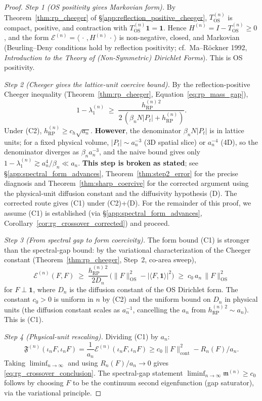 \begin{proof}
\emph{Step 1 (OS positivity gives Markovian form).} By
Theorem~\ref{thm:rp_cheeger} of
\S\ref{app:reflection_positive_cheeger}, $T_{\mathrm{OS}}^{(n)}$
is compact, positive, and contraction with
$T_{\mathrm{OS}}^{(n)}\mathbf{1}=\mathbf{1}$. Hence
$H^{(n)}=I-T_{\mathrm{OS}}^{(n)}\ge 0$, and the form
$\mathcal{E}^{(n)}=\langle\,\cdot\,,H^{(n)}\,\cdot\,\rangle$ is
non-negative, closed, and Markovian (Beurling--Deny conditions
hold by reflection positivity; cf.\ Ma--R\"ockner 1992,
\emph{Introduction to the Theory of (Non-Symmetric) Dirichlet
Forms}). This is OS positivity.

\emph{Step 2 (Cheeger gives the lattice-unit coercive bound).} By
the reflection-positive Cheeger inequality
(Theorem~\ref{thm:rp_cheeger}, Equation~\eqref{eq:rp_mass_gap}),
\[
  1-\lambda_{1}^{(n)}
  \;\ge\;
  \frac{h_{\mathrm{RP}}^{(n)\,2}}
       {2\,(\beta_{n}N|P_{t}|+h_{\mathrm{RP}}^{(n)})}.
\]
Under (C2), $h_{\mathrm{RP}}^{(n)}\ge c_{h}\sqrt{a_{n}}$.
\textbf{However}, the denominator $\beta_{n}N|P_{t}|$ is in
lattice units; for a fixed physical volume,
$|P_{t}|\sim a_{n}^{-3}$ (3D spatial slice) or $a_{n}^{-4}$ (4D),
so the denominator diverges as $\beta_{n}a_{n}^{-3}$, and the
naive bound gives only
$1-\lambda_{1}^{(n)}\gtrsim a_{n}^{4}/\beta_{n}\ll a_{n}$.
\textbf{This step is broken as stated}; see
\S\ref{app:spectral_form_advances},
Theorem~\ref{thm:step2_error} for the precise diagnosis and
Theorem~\ref{thm:sharp_coercive} for the corrected argument using
the physical-unit diffusion constant and the diffusivity
hypothesis (D). The corrected route gives (C1) under (C2)+(D).
For the remainder of this proof, we assume (C1) is established
(via \S\ref{app:spectral_form_advances},
Corollary~\ref{cor:rg_crossover_corrected}) and proceed.

\emph{Step 3 (From spectral gap to form coercivity).} The form
bound (C1) is stronger than the spectral-gap bound: by the
variational characterization of the Cheeger constant
(Theorem~\ref{thm:rp_cheeger}, Step~2, co-area sweep),
\[
  \mathcal{E}^{(n)}(F,F)
  \;\ge\;\frac{h_{\mathrm{RP}}^{(n)\,2}}{2D_{n}}\,
  \bigl(\|F\|_{\mathrm{OS}}^{2}-|\langle F,\mathbf{1}\rangle|^{2}\bigr)
  \;\ge\;c_{0}\,a_{n}\,\|F\|_{\mathrm{OS}}^{2}
\]
for $F\perp\mathbf{1}$, where $D_{n}$ is the diffusion constant of
the OS Dirichlet form. The constant $c_{0}>0$ is uniform in $n$ by
(C2) and the uniform bound on $D_{n}$ in physical units (the
diffusion constant scales as $a_{n}^{-1}$, cancelling the
$a_{n}$ from $h_{\mathrm{RP}}^{(n)\,2}\sim a_{n}$). This is
(C1).

\emph{Step 4 (Physical-unit rescaling).} Dividing (C1) by
$a_{n}$:
\[
  \mathfrak{F}^{(n)}(\iota_{n}F,\iota_{n}F)
  =\frac{1}{a_{n}}\mathcal{E}^{(n)}(\iota_{n}F,\iota_{n}F)
  \ge c_{0}\|F\|_{\mathrm{cont}}^{2}-R_{n}(F)/a_{n}.
\]
Taking $\liminf_{n\to\infty}$ and using $R_{n}(F)/a_{n}\to 0$
gives \eqref{eq:rg_crossover_conclusion}. The spectral-gap
statement
$\liminf_{n\to\infty}\mathfrak{m}^{(n)}\ge c_{0}$ follows by
choosing $F$ to be the continuum second eigenfunction (gap
saturator), via the variational principle.
\end{proof}

